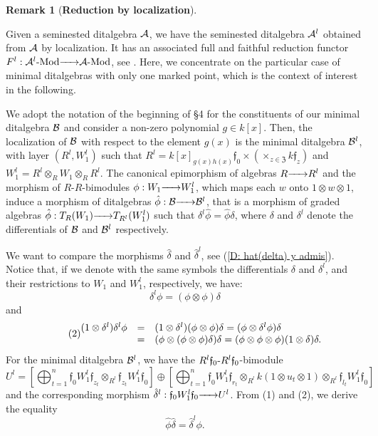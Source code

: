 \documentclass{article}
\theoremstyle{definition}
\newtheorem{remark}[theorem]{Remark}
\newcommand{\Mod}{{ \rm Mod }}
\renewcommand{\frak}{\mathfrak}
\newcommand{\g}{\hbox{-}}
\newcommand{\rightmap}[1]{\smash{\mathop{\hbox to 
20pt{\rightarrowfill}}\limits^{#1}}}
\begin{document}
\begin{remark}[\bf Reduction by localization]\label{R: localization}

Given a seminested ditalgebra ${\cal A}$, we have the seminested ditalgebra ${\cal A}^l$ obtained from ${\cal A}$ by localization.  It has an associated full and faithful reduction functor $F^l:{\cal A}^l\g\Mod\rightmap{}{\cal A}\g\Mod$, see \cite[(17.7) and (26.4)]{BSZ}. Here, we concentrate on the particular case of minimal ditalgebras with only one marked point, which is  the context of interest in the following. 

We adopt the notation of the beginning of \S4 for the constituents of our minimal ditalgebra ${\cal B}$ and consider a non-zero polynomial $g\in k[x]$. Then, the localization of ${\cal B}$ with respect to the element $g(x)$ is the minimal ditalgebra ${\cal B}^l$, with layer $(R^l,W_1^l)$ such that $R^l=k[x]_{g(x)h(x)}\frak{f}_0\times (\times_{z\in \frak{Z}}k\frak{f}_z)$ and $W_1^l=R^l\otimes_RW_1\otimes_RR^l$. The canonical epimorphism of algebras $R\rightmap{}R^l$ and the  morphism of $R$-$R$-bimodules $\phi:W_1\rightmap{}W^l_1$, which maps each $w$ onto $1\otimes w\otimes 1$, induce a morphism of ditalgebras $\hat{\phi}:{\cal B}\rightmap{}{\cal B}^l$, that is a morphism of graded algebras 
$\hat{\phi}:T_R(W_1)\rightmap{}T_{R^l}(W_1^l)$ such that $\delta^l\hat{\phi}=\hat{\phi}\delta$, where $\delta$ and $\delta^l$ denote the differentials of ${\cal B}$ and ${\cal B}^l$ respectively. 

We want to compare the morphisms $\hat{\delta}$ and $\hat{\delta}^l$, see (\ref{D: hat(delta) y admis}). Notice that, if we denote with the same symbols the differentials  $\delta$ and $\delta^l$, and their restrictions to $W_1$ and $W_1^l$, respectively, we have:
\begin{equation}\tag{1} \delta^l\phi=(\phi\otimes\phi)\delta
\end{equation}
and
\begin{equation}\tag{2} \begin{matrix}(1\otimes\delta^l)\delta^l\phi
&=&
(1\otimes\delta^l)(\phi\otimes\phi)\delta
=
(\phi\otimes\delta^l\phi)\delta\hfill\\
&=&
(\phi\otimes(\phi\otimes\phi)\delta)\delta=(\phi\otimes\phi\otimes\phi)(1\otimes\delta)\delta.\end{matrix}
\end{equation}
For the minimal ditalgebra ${\cal B}^l$, we have the $R^l\frak{f}_0\g R^l\frak{f}_0$-bimodule
$$U^l=
\left[\bigoplus_{t=1}^n
\frak{f}_0W^l_1\frak{f}_{z_t}
\otimes_{R^l}\frak{f}_{z_t}W^l_1\frak{f}_0\right]
\oplus\left[\bigoplus_{t=1}^n
\frak{f}_0W^l_1\frak{f}_{r_t}\otimes_{R^l}k(1\otimes u_t\otimes 1)\otimes_{R^l}\frak{f}_{l_t}W^l_1\frak{f}_0\right]
$$
and the corresponding morphism $\hat{\delta}^l:\frak{f}_0W^l_1\frak{f}_0\rightmap{}U^l$. From (1) and (2), we derive the equality  
$$\hat{\phi}\hat{\delta}=\hat{\delta}^l\phi.$$
 

\end{remark}
\end{document}
